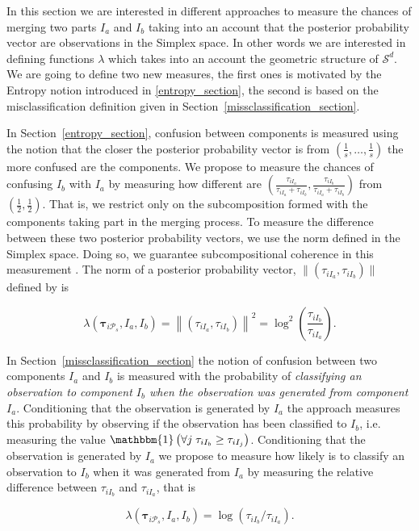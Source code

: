 \documentclass[10pt, a4paper]{article}
\newcommand{\m}[1]{\boldsymbol{#1}}
\begin{document}
\begin{spacing}{1.9}
In this section we are interested in different approaches to measure the chances of merging two parts $I_a$ and $I_b$ taking into an account that the posterior probability vector are observations in the Simplex space. In other words we are interested in defining functions $\lambda$ which takes into an account the geometric structure of $\mathcal{S}^d$. We are going to define two new measures, the first ones is motivated by the Entropy notion introduced in \ref{entropy_section}, the second is based on the misclassification definition given in Section~\ref{missclassification_section}.


In Section~\ref{entropy_section}, confusion between components is measured using the notion that the closer the posterior probability vector is from $(\frac{1}{s}, \dots, \frac{1}{s})$ the more confused are the components. We propose to measure the chances of confusing $I_b$ with $I_a$  by measuring how different are $(\frac{\tau_{i I_a}}{\tau_{i I_a} +\tau_{i I_b}}, \frac{\tau_{i I_b}}{\tau_{i I_a} + \tau_{i I_b}})$ from $(\frac{1}{2}, \frac{1}{2})$. That is, we restrict only on the subcomposition formed with the components taking part in the merging process. To measure the difference between these two posterior probability vectors, we use the norm defined in the Simplex space. Doing so, we guarantee subcompositional coherence in this measurement \citep{aitchison1986statistical}. The norm of a posterior probability vector, $\| (\tau_{iI_a}, \tau_{iI_b}) \|$  defined by \cite{aitchison2002simplicial} is 

\[
\lambda(\m\tau_{i \mathcal{P}_s},  I_a,  I_b) = \left\| (\tau_{iI_a}, \tau_{iI_b}) \right\|^2 = \log^2 \left(\frac{ \tau_{iI_b} }{ \tau_{iI_a} }\right).
\]


In Section~\ref{missclassification_section} the notion of confusion between two components $I_a$ and $I_b$ is measured with the probability of \emph{classifying an observation to component $I_b$ when the observation was generated from component $I_a$}. Conditioning that the observation is generated by $I_a$  the approach measures this probability by observing if the observation has been classified to $I_b$, i.e.  measuring the value $\mathbbm{1}\left( \forall j\; \tau_{i I_{b}} \geq \tau_{i I_j} \right)$. Conditioning that the observation is generated by $I_a$ we propose to measure how likely is to classify an observation to $I_b$ when it was generated from $I_a$ by measuring the relative difference between $\tau_{i I_b}$ and $\tau_{i I_a}$, that is 

\[
\lambda(\m\tau_{i \mathcal{P}_s},  I_a,  I_b) = \log( \tau_{i I_b}/\tau_{i I_a}).
\]




\end{spacing}
\end{document}
